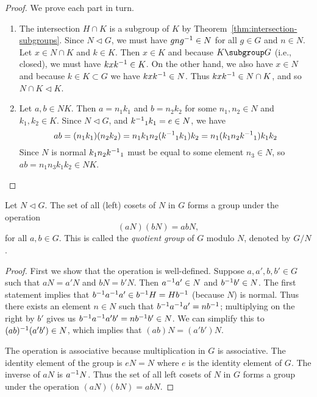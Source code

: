 \begin{proof}
    We prove each part in turn.
    \begin{enumerate}[label=(\alph*), wide]
        \item The intersection \(H \cap K\) is a subgroup of \(K\) by
        Theorem~\ref{thm:intersection-subgroups}. Since \(N \triangleleft G\),
        we must have \(gng^{-1} \in N\) for all \(g \in G\) and \(n \in N\). Let
        \(x \in N \cap K\) and \(k \in K\). Then \(x \in K\) and because \(K
        \subgroup G\) (i.e., closed), we must have \(kxk^{-1} \in K\). On the
        other hand, we also have \(x \in N\) and because \(k \in K \subset G\)
        we have \(kxk^{-1} \in N\). Thus \(kxk^{-1} \in N \cap K\), and so \(N
        \cap K \triangleleft K\).
        
        \item Let \(a, b \in NK\). Then \(a = n_1k_1\) and \(b = n_2k_2\) for
        some \(n_1, n_2 \in N\) and \(k_1, k_2 \in K\). Since \(N \triangleleft
        G\), and \({k^{-1}}_1k_1 = e \in N\), we have
        \[
            ab = (n_1k_1)(n_2k_2) = n_1k_1n_2({k^{-1}}_1k_1)k_2 = n_1(k_1n_2{k^{-1}}_1)k_1k_2
        \]
        Since \(N\) is normal \(k_1n_2{k^{-1}}_1\) must be equal to some element
        \(n_3 \in N\), so \(ab = n_1n_3k_1k_2 \in NK\).
    \end{enumerate}
\end{proof}

\begin{theorem}
    \label{thm:quotient-group}
    Let \(N \triangleleft G\). The set of all (left) cosets of \(N\) in \(G\)
    forms a group under the operation
    \[
        (aN)(bN) = abN,
    \]
    for all \(a, b \in G\). This is called the \emph{quotient group} of \(G\)
    modulo \(N\), denoted by \(G/N\).
\end{theorem}

\begin{proof}
    First we show that the operation is well-defined. Suppose \(a, a', b, b' \in
    G\) such that \(aN = a'N\) and \(bN = b'N\). Then \(a^{-1} a' \in N\) and
    \(b^{-1} b' \in N\). The first statement implies that \(b^{-1} a^{-1} a' \in
    b^{-1} H = Hb^{-1}\) (because \(N\)) is normal. Thus there exists an element
    \(n \in N\) such that \(b^{-1} a^{-1} a' = nb^{-1}\); multiplying on the right
    by \(b'\) gives us \(b^{-1} a^{-1} a'b' = nb^{-1} b' \in N\). We can simplify
    this to \((ab)^{-1}(a'b') \in N\), which implies that \((ab)N = (a'b')N\).

    The operation is associative because multiplication in \(G\) is associative.
    The identity element of the group is \(eN = N\) where \(e\) is the identity
    element of \(G\). The inverse of \(aN\) is \(a^{-1} N\). Thus the set of all
    left cosets of \(N\) in \(G\) forms a group under the operation \((aN)(bN) =
    abN\).
\end{proof}

